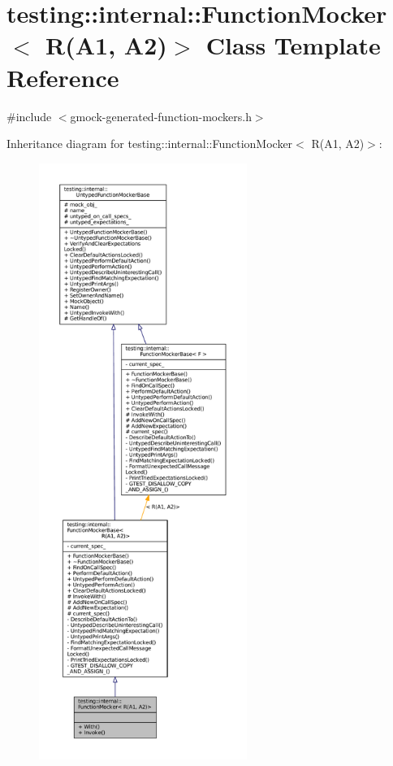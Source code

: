 \hypertarget{classtesting_1_1internal_1_1FunctionMocker_3_01R_07A1_00_01A2_08_4}{}\section{testing\+:\+:internal\+:\+:Function\+Mocker$<$ R(A1, A2)$>$ Class Template Reference}
\label{classtesting_1_1internal_1_1FunctionMocker_3_01R_07A1_00_01A2_08_4}


{\ttfamily \#include $<$gmock-\/generated-\/function-\/mockers.\+h$>$}



Inheritance diagram for testing\+:\+:internal\+:\+:Function\+Mocker$<$ R(A1, A2)$>$\+:
\nopagebreak
\begin{figure}[H]
\begin{center}
\leavevmode
\includegraphics[height=550pt]{classtesting_1_1internal_1_1FunctionMocker_3_01R_07A1_00_01A2_08_4__inherit__graph}
\end{center}
\end{figure}


